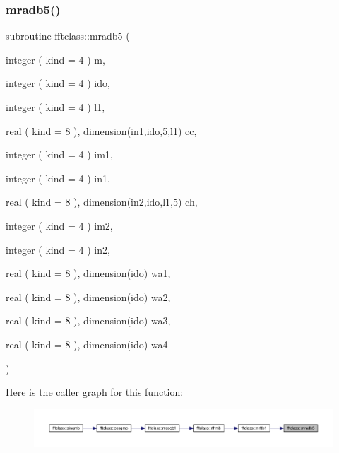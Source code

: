 \subsubsection{\texorpdfstring{mradb5()}{mradb5()}}
{\footnotesize\ttfamily subroutine fftclass\+::mradb5 (\begin{DoxyParamCaption}\item[{integer ( kind = 4 )}]{m,  }\item[{integer ( kind = 4 )}]{ido,  }\item[{integer ( kind = 4 )}]{l1,  }\item[{real ( kind = 8 ), dimension(in1,ido,5,l1)}]{cc,  }\item[{integer ( kind = 4 )}]{im1,  }\item[{integer ( kind = 4 )}]{in1,  }\item[{real ( kind = 8 ), dimension(in2,ido,l1,5)}]{ch,  }\item[{integer ( kind = 4 )}]{im2,  }\item[{integer ( kind = 4 )}]{in2,  }\item[{real ( kind = 8 ), dimension(ido)}]{wa1,  }\item[{real ( kind = 8 ), dimension(ido)}]{wa2,  }\item[{real ( kind = 8 ), dimension(ido)}]{wa3,  }\item[{real ( kind = 8 ), dimension(ido)}]{wa4 }\end{DoxyParamCaption})}

Here is the caller graph for this function\+:\nopagebreak
\begin{figure}[H]
\begin{center}
\leavevmode
\includegraphics[width=350pt]{namespacefftclass_a69781205c1568e37470a06e001a0dae7_icgraph}
\end{center}
\end{figure}
\mbox{\label{namespacefftclass_ae156d4969bbcc9250a0dc81ee91d3cdf}} 
